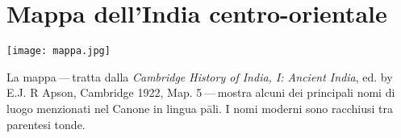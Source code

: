 \chapter{Mappa dell'India centro-orientale}

\vspace*{\baselineskip}

{\centering
  \texttt{[image: mappa.jpg]}
\par}

\vspace*{1.5\baselineskip}

La mappa — tratta dalla \emph{Cambridge History of India, I: Ancient India}, ed.
by E.J. R Apson, Cambridge 1922, Map. 5 — mostra alcuni dei principali nomi
di luogo menzionati nel Canone in lingua pāli. I nomi moderni sono
racchiusi tra parentesi tonde.

